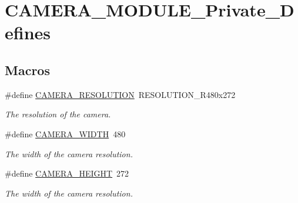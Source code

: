 \hypertarget{group___c_a_m_e_r_a___m_o_d_u_l_e___private___defines}{}\section{C\+A\+M\+E\+R\+A\+\_\+\+M\+O\+D\+U\+L\+E\+\_\+\+Private\+\_\+\+Defines}
\label{group___c_a_m_e_r_a___m_o_d_u_l_e___private___defines}
\subsection*{Macros}
\begin{DoxyCompactItemize}
\item 
\mbox{\label{group___c_a_m_e_r_a___m_o_d_u_l_e___private___defines_ga6ec7b5182ecf564707220fda459b72c5}} 
\#define \hyperlink{group___c_a_m_e_r_a___m_o_d_u_l_e___private___defines_ga6ec7b5182ecf564707220fda459b72c5}{C\+A\+M\+E\+R\+A\+\_\+\+R\+E\+S\+O\+L\+U\+T\+I\+ON}~R\+E\+S\+O\+L\+U\+T\+I\+O\+N\+\_\+\+R480x272
\begin{DoxyCompactList}\small\item\em The resolution of the camera. \end{DoxyCompactList}\item 
\mbox{\label{group___c_a_m_e_r_a___m_o_d_u_l_e___private___defines_ga48447a9f1224dfc39abebc6a6d920d36}} 
\#define \hyperlink{group___c_a_m_e_r_a___m_o_d_u_l_e___private___defines_ga48447a9f1224dfc39abebc6a6d920d36}{C\+A\+M\+E\+R\+A\+\_\+\+W\+I\+D\+TH}~480
\begin{DoxyCompactList}\small\item\em The width of the camera resolution. \end{DoxyCompactList}\item 
\mbox{\label{group___c_a_m_e_r_a___m_o_d_u_l_e___private___defines_ga6ffdd1d90debad0734331c202651c0bc}} 
\#define \hyperlink{group___c_a_m_e_r_a___m_o_d_u_l_e___private___defines_ga6ffdd1d90debad0734331c202651c0bc}{C\+A\+M\+E\+R\+A\+\_\+\+H\+E\+I\+G\+HT}~272
\begin{DoxyCompactList}\small\item\em The width of the camera resolution. \end{DoxyCompactList}\item 

\end{DoxyCompactItemize}
